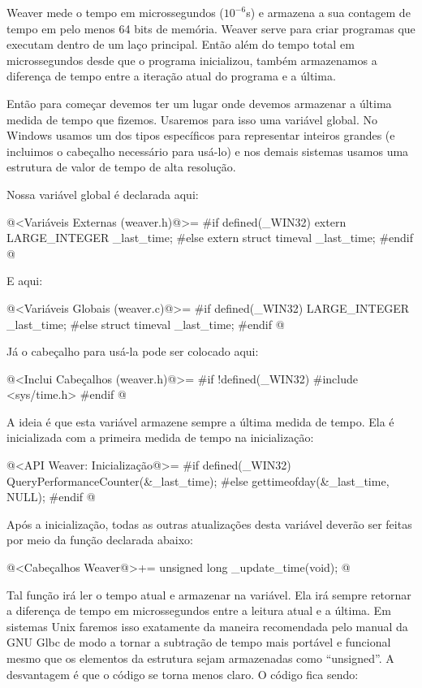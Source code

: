 
Weaver mede o tempo em microssegundos ($10^{-6}$s) e armazena a sua
contagem de tempo em pelo menos 64 bits de memória. Weaver serve para
criar programas que executam dentro de um laço principal. Então além
do tempo total em microssegundos desde que o programa inicializou,
também armazenamos a diferença de tempo entre a iteração atual do
programa e a última.

Então para começar devemos ter um lugar onde devemos armazenar a
última medida de tempo que fizemos. Usaremos para isso uma variável
global. No Windows usamos um dos tipos específicos para representar
inteiros grandes (e incluimos o cabeçalho necessário para usá-lo)
e nos demais sistemas usamos uma estrutura de valor de tempo de
alta resolução.

Nossa variável global é declarada aqui:

\iniciocodigo
@<Variáveis Externas (weaver.h)@>=
#if defined(_WIN32)
extern LARGE_INTEGER _last_time;
#else
extern struct timeval _last_time;
#endif
@
\fimcodigo

E aqui:

\iniciocodigo
@<Variáveis Globais (weaver.c)@>=
#if defined(_WIN32)
LARGE_INTEGER _last_time;
#else
struct timeval _last_time;
#endif
@
\fimcodigo

Já o cabeçalho para usá-la pode ser colocado aqui:

\iniciocodigo
@<Inclui Cabeçalhos (weaver.h)@>=
#if !defined(_WIN32)
#include <sys/time.h>
#endif
@
\fimcodigo

A ideia é que esta variável armazene sempre a última medida de
tempo. Ela é inicializada com a primeira medida de tempo na
inicialização:

\iniciocodigo
@<API Weaver: Inicialização@>=
#if defined(_WIN32)
QueryPerformanceCounter(&_last_time);
#else
gettimeofday(&_last_time, NULL);
#endif
@
\fimcodigo

Após a inicialização, todas as outras atualizações desta variável
deverão ser feitas por meio da função declarada abaixo:

\iniciocodigo
@<Cabeçalhos Weaver@>+=
unsigned long _update_time(void);
@
\fimcodigo

Tal função irá ler o tempo atual e armazenar na variável. Ela irá
sempre retornar a diferença de tempo em microssegundos entre a leitura
atual e a última. Em sistemas Unix faremos isso exatamente da maneira
recomendada pelo manual da GNU Glbc de modo a tornar a subtração de
tempo mais portável e funcional mesmo que os elementos da
estrutura  sejam armazenadas como ``unsigned''.  A
desvantagem é que o código se torna menos claro. O código fica sendo:

